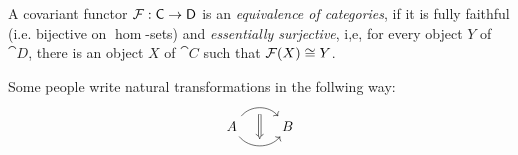 \begin{defn}
  A covariant functor $\mathcal{F}:\mathsf{C}\to \mathsf{D}$ is an \emph{equivalence of categories}, if it is fully faithful (i.e. bijective on $\hom$-sets) and \emph{essentially surjective}, i,e, for every object $Y$ of $\cat{D}$, there is an object $X$ of $\cat{C}$ such that $\mathcal{F}(X)\cong Y$.
\end{defn}

Some people write natural transformations in the follwing way:
\[
\begin{tikzcd}
A \arrow[r, bend left=50, ""{name=U, below}]
\arrow[r, bend right=50, ""{name=D}]
&B
\arrow[Rightarrow, from=U, to=D] \end{tikzcd}
\]

